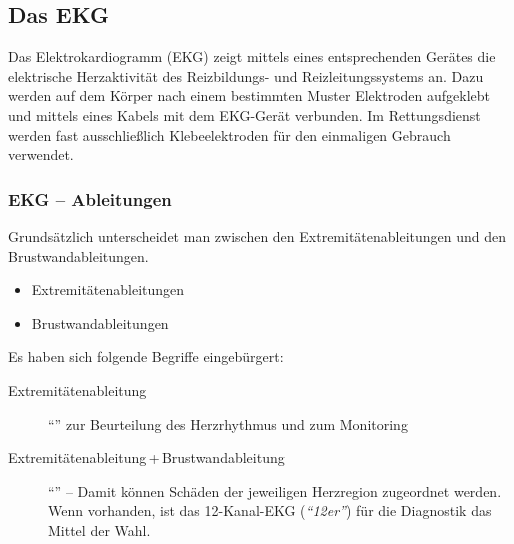 \subsection{Das EKG}
\label{topic:ekg}

Das Elektrokardiogramm (EKG) zeigt mittels eines entsprechenden
Gerätes die elektrische Herzaktivität des
Reizbildungs- und Reizleitungssystems an. Dazu werden auf
dem Körper nach einem bestimmten Muster Elektroden
aufgeklebt und mittels eines Kabels mit dem EKG-Gerät
verbunden. Im Rettungsdienst werden fast ausschließlich
Klebeelektroden für den einmaligen Gebrauch verwendet. 

 



\subsubsection{EKG -- Ableitungen}
\label{topic:ekg-ableitungen}
Grundsätzlich unterscheidet man zwischen den Extremitätenableitungen
und den Brustwandableitungen. 

\begin{itemize}
    \item Extremitätenableitungen
    \item Brustwandableitungen
\end{itemize}

Es haben sich folgende Begriffe eingebürgert:

\begin{description}
    \item[Extremitätenableitung] "`"'
    zur Beurteilung des Herzrhythmus und zum Monitoring
    \item[Extremitätenableitung\,+\,Brustwandableitung]
    "`"' -- Damit können Schäden der
    jeweiligen Herzregion zugeordnet werden. Wenn vorhanden,
    ist das 12-Kanal-EKG (\emph{"`12er"'}) für die
    Diagnostik das Mittel der Wahl. 
\end{description}

